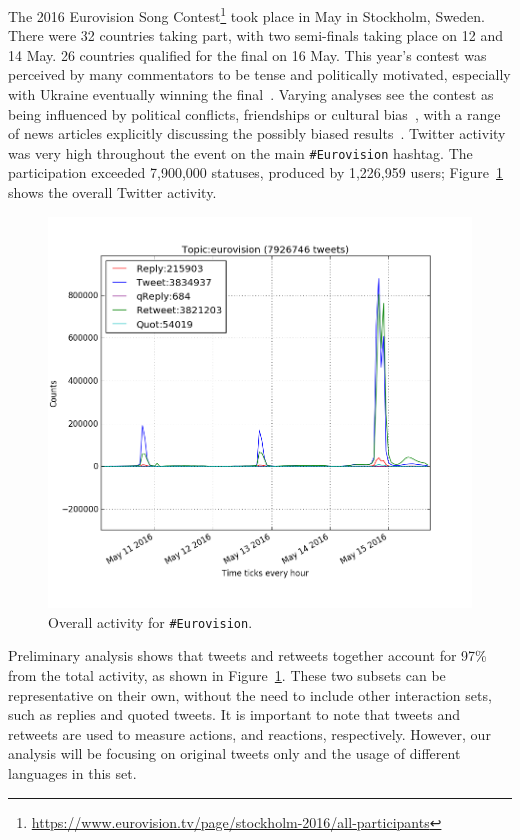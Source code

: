 The 2016 Eurovision Song
Contest\footnote{\url{https://www.eurovision.tv/page/stockholm-2016/all-participants}}
took place in May in Stockholm, Sweden. There were 32 countries taking
part, with two semi-finals taking place on 12 and 14 May. 26 countries
qualified for the final on 16 May. This year’s contest was perceived
by many commentators to be tense and politically motivated, especially
with Ukraine eventually winning the
final~\cite{telegrapheuroboycott:2016}. Varying analyses see the
contest as being influenced by political conflicts, friendships or
cultural
bias~\cite{ginsburgh+noury:2008,charron:2013,blangiardo+baio:2014,budzinski+pannicke:2016},
with a range of news articles explicitly discussing the possibly
biased results~\cite{telegrapheurobias:2016}.  Twitter activity was
very high throughout the event on the main {\texttt{\#Eurovision}}
hashtag. The participation exceeded 7,900,000 statuses, produced by
1,226,959 users; Figure~\ref{fig:overalleurovisionactivity} shows the overall
Twitter activity.

\begin{figure}[htb]
\centering
\includegraphics[width=\columnwidth]{images/overalleurovisionactivity.png}
\caption{Overall activity for {\texttt{\#Eurovision}}.}
\label{fig:overalleurovisionactivity}
\end{figure}

Preliminary analysis shows that tweets and retweets together account
for 97\% from the total activity, as shown in
Figure~\ref{fig:overalleurovisionactivity}. These two subsets can be
representative on their own, without the need to include other
interaction sets, such as replies and quoted tweets. It is important
to note that tweets and retweets are used to measure actions, and
reactions, respectively. However, our analysis will be focusing on
original tweets only and the usage of different languages in this set.

